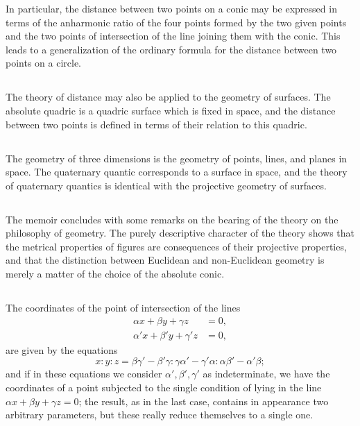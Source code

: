 \documentclass[11pt,a4paper]{book}
\begin{document}
\begin{center}
In particular, the distance between two points on a conic may be expressed in terms of the anharmonic ratio of the four points formed by the two given points and the two points of intersection of the line joining them with the conic. This leads to a generalization of the ordinary formula for the distance between two points on a circle.

\subsection{}

The theory of distance may also be applied to the geometry of surfaces. The absolute quadric is a quadric surface which is fixed in space, and the distance between two points is defined in terms of their relation to this quadric.

\subsection{}

The geometry of three dimensions is the geometry of points, lines, and planes in space. The quaternary quantic corresponds to a surface in space, and the theory of quaternary quantics is identical with the projective geometry of surfaces.

\subsection{}

The memoir concludes with some remarks on the bearing of the theory on the philosophy of geometry. The purely descriptive character of the theory shows that the metrical properties of figures are consequences of their projective properties, and that the distinction between Euclidean and non-Euclidean geometry is merely a matter of the choice of the absolute conic.

\subsection{}

The coordinates of the point of intersection of the lines
\begin{align*}
\alpha x + \beta y + \gamma z &= 0,\\
\alpha' x + \beta' y + \gamma' z &= 0,
\end{align*}
are given by the equations
\[
x : y : z = \beta\gamma' - \beta'\gamma : \gamma\alpha' - \gamma'\alpha : \alpha\beta' - \alpha'\beta;
\]
and if in these equations we consider $\alpha', \beta', \gamma'$ as indeterminate, we have the coordinates of a point subjected to the single condition of lying in the line $\alpha x + \beta y + \gamma z = 0$; the result, as in the last case, contains in appearance two arbitrary parameters, but these really reduce themselves to a single one.


\end{center}
\end{document}
